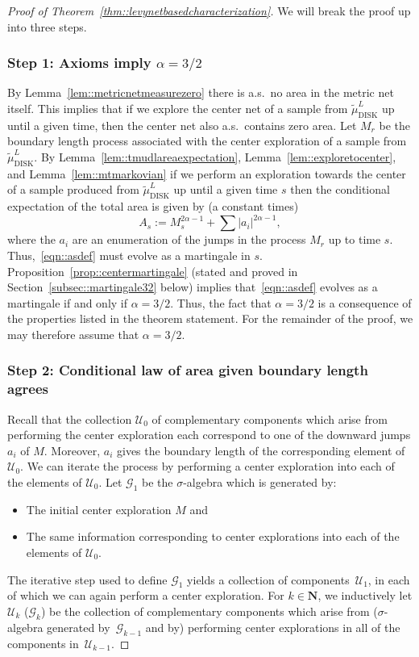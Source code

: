 \documentclass[10pt]{amsart}
\let\mathcal\mathscr
\theoremstyle{plain}
\numberwithin{theorem}{section}
\theoremstyle{definition}
\newcommand{\CU}{{\mathcal U}}
\newcommand{\CG}{{\mathcal G}}
\newcommand{\N}{\mathbf{N}}
\newcommand{\tmudl}{\wt{\mu}_{\mathrm{DISK}}^L}
\let\wt\widetilde
\begin{document}
\begin{proof}[Proof of Theorem~\ref{thm::levynetbasedcharacterization}]
We will break the proof up into three steps.

\subsubsection*{Step 1: Axioms imply $\alpha = 3/2$} By Lemma~\ref{lem::metricnetmeasurezero} there is a.s.\ no area in the metric net itself. This implies that if we explore the center net of a sample from $\tmudl$ up until a given time, then the center net also a.s.\ contains zero area. Let $M_r$ be the boundary length process associated with the center exploration of a sample from $\tmudl$. By Lemma~\ref{lem::tmudlareaexpectation}, Lemma~\ref{lem::exploretocenter}, and Lemma~\ref{lem::mtmarkovian} if we perform an exploration towards the center of a sample produced from $\tmudl$ up until a given time $s$ then the conditional expectation of the total area is given by (a constant times)
\begin{equation}
\label{eqn::asdef}
A_s := M_s^{2\alpha-1} + \sum |a_i|^{2\alpha - 1},
\end{equation}
where the $a_i$ are an enumeration of the jumps in the process $M_r$ up to time $s$. Thus,~\eqref{eqn::asdef} must evolve as a martingale in $s$. Proposition~\ref{prop::centermartingale} (stated and proved in Section~\ref{subsec::martingale32} below) implies that~\eqref{eqn::asdef} evolves as a martingale if and only if $\alpha = 3/2$. Thus, the fact that $\alpha = 3/2$ is a consequence of the properties listed in the theorem statement. For the remainder of the proof, we may therefore assume that $\alpha = 3/2$.

\subsubsection*{Step 2: Conditional law of area given boundary length agrees} Recall that the collection $\CU_0$ of complementary components which arise from performing the center exploration each correspond to one of the downward jumps $a_i$ of $M$. Moreover, $a_i$ gives the boundary length of the corresponding element of $\CU_0$. We can iterate the process by performing a center exploration into each of the elements of $\CU_0$. Let $\CG_1$ be the $\sigma$-algebra which is generated by:
\begin{itemize}
\item The initial center exploration $M$ and
\item The same information corresponding to center explorations into each of the elements of $\CU_0$.
\end{itemize}
The iterative step used to define $\CG_1$ yields a collection of components~$\CU_1$, in each of which we can again perform a center exploration. For $k \in \N$, we inductively let $\CU_k$ (\resp $\CG_k$) be the collection of complementary components which arise from (\resp $\sigma$-algebra generated by~$\CG_{k-1}$ and by) performing center explorations in all of the components in~$\CU_{k-1}$.


\end{proof}
\end{document}
